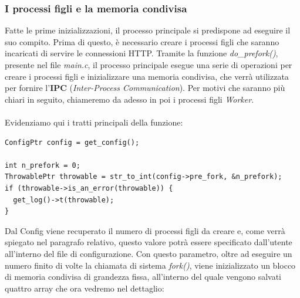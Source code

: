 \documentclass[italian]{tktltiki2}
\begin{document}
\subsubsection{I processi figli e la memoria condivisa}
\label{ssec:child_process}

Fatte le prime inizializzazioni, il processo principale si predispone ad eseguire il suo compito. Prima di questo, è necessario creare i processi figli che saranno incaricati di servire le connessioni HTTP. Tramite la funzione \emph{do\_prefork()}, presente nel file \emph{main.c}, il processo principale esegue una serie di operazioni per creare i processi figli e inizializzare una memoria condivisa, che verrà utilizzata per fornire l'\textbf{IPC} (\emph{Inter-Process Communication}). Per motivi che saranno più chiari in seguito, chiameremo da adesso in poi i processi figli \emph{Worker}. \\\\Evidenziamo qui i tratti principali della funzione:
\begin{lstlisting}
ConfigPtr config = get_config();

int n_prefork = 0;
ThrowablePtr throwable = str_to_int(config->pre_fork, &n_prefork);
if (throwable->is_an_error(throwable)) {
  get_log()->t(throwable);
}
\end{lstlisting}
Dal Config viene recuperato il numero di processi figli da creare e, come verrà spiegato nel paragrafo relativo, questo valore potrà essere specificato dall'utente all'interno del file di configurazione. Con questo parametro, oltre ad eseguire un numero finito di volte la chiamata di sistema \emph{fork()}, viene inizializzato un blocco di memoria condivisa di grandezza fissa, all'interno del quale vengono salvati quattro array che ora vedremo nel dettaglio:
\end{document}

